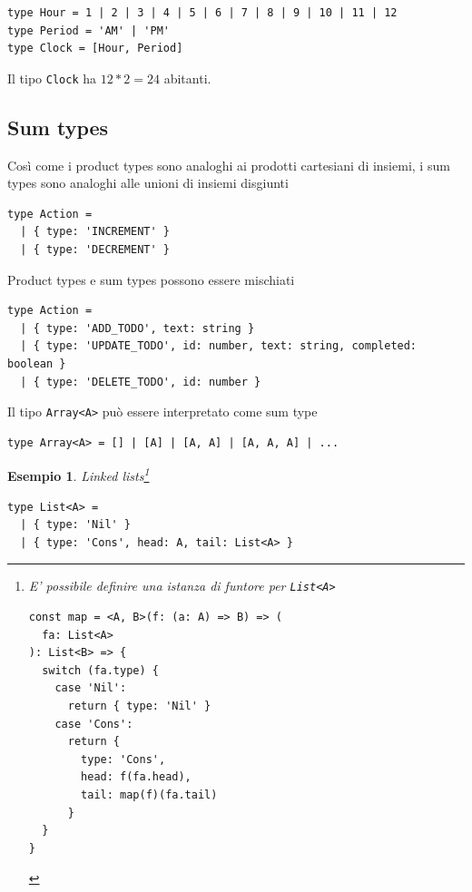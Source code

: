 \documentclass[12pt]{article}
\newtheorem{example}{Esempio}
\begin{document}
\begin{verbatim}
type Hour = 1 | 2 | 3 | 4 | 5 | 6 | 7 | 8 | 9 | 10 | 11 | 12
type Period = 'AM' | 'PM'
type Clock = [Hour, Period]
\end{verbatim}

Il tipo \texttt{Clock} ha $12 * 2 = 24$ abitanti.

\subsection{Sum types}

Così come i product types sono analoghi ai prodotti cartesiani di insiemi, i sum types sono analoghi alle unioni di insiemi disgiunti

\begin{verbatim}
type Action =
  | { type: 'INCREMENT' }
  | { type: 'DECREMENT' }
\end{verbatim}

Product types e sum types possono essere mischiati

\begin{verbatim}
type Action =
  | { type: 'ADD_TODO', text: string }
  | { type: 'UPDATE_TODO', id: number, text: string, completed: boolean }
  | { type: 'DELETE_TODO', id: number }
\end{verbatim}

Il tipo \texttt{Array<A>} può essere interpretato come sum type

\begin{verbatim}
type Array<A> = [] | [A] | [A, A] | [A, A, A] | ...
\end{verbatim}

\begin{example}
Linked lists\footnote{E' possibile definire una istanza di funtore per \texttt{List<A>}

\begin{verbatim}
const map = <A, B>(f: (a: A) => B) => (
  fa: List<A>
): List<B> => {
  switch (fa.type) {
    case 'Nil':
      return { type: 'Nil' }
    case 'Cons':
      return {
        type: 'Cons',
        head: f(fa.head),
        tail: map(f)(fa.tail)
      }
  }
}
\end{verbatim}
}

\begin{verbatim}
type List<A> =
  | { type: 'Nil' }
  | { type: 'Cons', head: A, tail: List<A> }
\end{verbatim}
\end{example}
\end{document}
